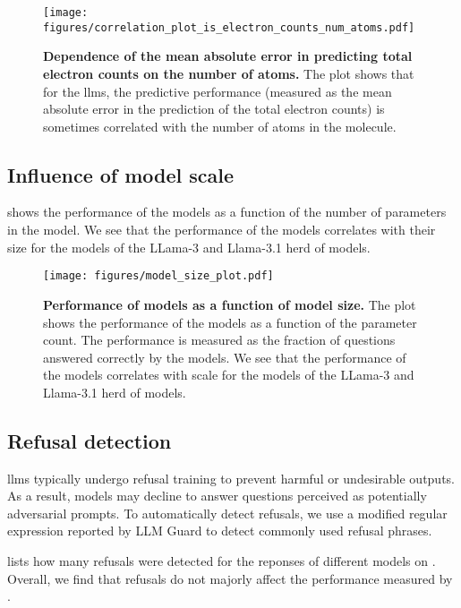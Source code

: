 \begin{figure}[!h]
    \centering
    \texttt{[image: figures/correlation\_plot\_is\_electron\_counts\_num\_atoms.pdf]}
    \caption{\textbf{Dependence of the mean absolute error in predicting total electron counts on the number of atoms.} The plot shows that for the \glspl{llm}, the predictive performance (measured as the mean absolute error in the prediction of the total electron counts) is sometimes correlated with the number of atoms in the molecule.}
    \label{fig:correlation_plot_is_electron_counts_num_atoms}
\end{figure}


\clearpage
\subsection{Influence of model scale}
 shows the performance of the models as a function of the number of parameters in the model.
We see that the performance of the models correlates with their size for the models of the LLama-3 and Llama-3.1 herd of models.

\begin{figure}[!h]
    \centering
    \texttt{[image: figures/model\_size\_plot.pdf]}
    \caption{\textbf{Performance of models as a function of model size.} The plot shows the performance of the models as a function of the parameter count. The performance is measured as the fraction of questions answered correctly by the models. We see that the performance of the models correlates with scale for the models of the LLama-3 and Llama-3.1 herd of models.}
    \label{fig:model_size_plot}
\end{figure}


\clearpage
\subsection{Refusal detection}
\Glspl{llm} typically undergo refusal training to prevent harmful or undesirable outputs. As a result, models may decline to answer questions perceived as potentially adversarial prompts.
To automatically detect refusals, we use a modified regular expression reported by LLM Guard\autocite{llmguard} to detect commonly used refusal phrases.

 lists how many refusals were detected for the reponses of different models on \chembench. Overall, we find that refusals do not majorly affect the performance measured by \chembench.


